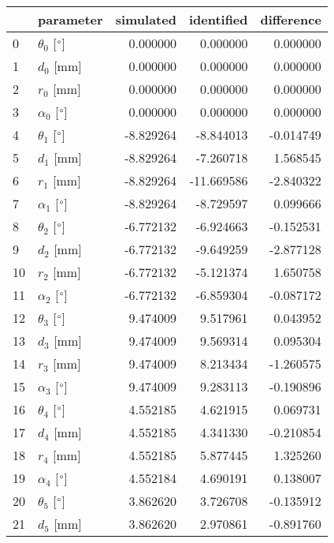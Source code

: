\documentclass{standalone}%
\begin{document}
%
\normalsize%
\begin{tabular}{llrrr}
\toprule
{} &                 parameter & simulated & identified & difference \\
\midrule
0  &  $\theta_{0}$ [$\degree$] &  0.000000 &   0.000000 &   0.000000 \\
1  &              $d_{0}$ [mm] &  0.000000 &   0.000000 &   0.000000 \\
2  &              $r_{0}$ [mm] &  0.000000 &   0.000000 &   0.000000 \\
3  &  $\alpha_{0}$ [$\degree$] &  0.000000 &   0.000000 &   0.000000 \\
4  &  $\theta_{1}$ [$\degree$] & -8.829264 &  -8.844013 &  -0.014749 \\
5  &              $d_{1}$ [mm] & -8.829264 &  -7.260718 &   1.568545 \\
6  &              $r_{1}$ [mm] & -8.829264 & -11.669586 &  -2.840322 \\
7  &  $\alpha_{1}$ [$\degree$] & -8.829264 &  -8.729597 &   0.099666 \\
8  &  $\theta_{2}$ [$\degree$] & -6.772132 &  -6.924663 &  -0.152531 \\
9  &              $d_{2}$ [mm] & -6.772132 &  -9.649259 &  -2.877128 \\
10 &              $r_{2}$ [mm] & -6.772132 &  -5.121374 &   1.650758 \\
11 &  $\alpha_{2}$ [$\degree$] & -6.772132 &  -6.859304 &  -0.087172 \\
12 &  $\theta_{3}$ [$\degree$] &  9.474009 &   9.517961 &   0.043952 \\
13 &              $d_{3}$ [mm] &  9.474009 &   9.569314 &   0.095304 \\
14 &              $r_{3}$ [mm] &  9.474009 &   8.213434 &  -1.260575 \\
15 &  $\alpha_{3}$ [$\degree$] &  9.474009 &   9.283113 &  -0.190896 \\
16 &  $\theta_{4}$ [$\degree$] &  4.552185 &   4.621915 &   0.069731 \\
17 &              $d_{4}$ [mm] &  4.552185 &   4.341330 &  -0.210854 \\
18 &              $r_{4}$ [mm] &  4.552185 &   5.877445 &   1.325260 \\
19 &  $\alpha_{4}$ [$\degree$] &  4.552184 &   4.690191 &   0.138007 \\
20 &  $\theta_{5}$ [$\degree$] &  3.862620 &   3.726708 &  -0.135912 \\
21 &              $d_{5}$ [mm] &  3.862620 &   2.970861 &  -0.891760 \\

\end{tabular}
\end{document}
